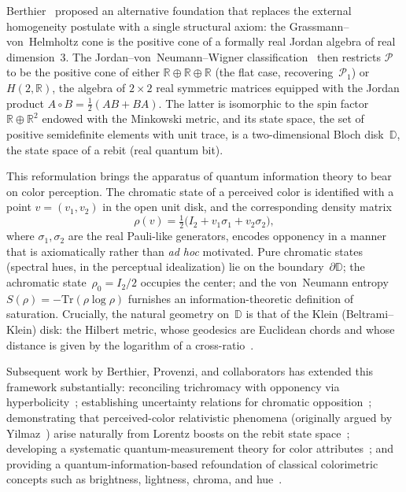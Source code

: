 \documentclass[11pt]{article}
\theoremstyle{plain}
\theoremstyle{definition}
\theoremstyle{remark}
\begin{document}
Berthier~\cite{Berthier2020} proposed an alternative foundation that replaces the external homogeneity postulate with a single structural axiom: the Grassmann--von~Helmholtz cone is the positive cone of a formally real Jordan algebra of real dimension~$3$.
The Jordan--von~Neumann--Wigner classification~\cite{Jordan1934} then restricts $\mathcal{P}$ to be the positive cone of either $\mathbb{R} \oplus \mathbb{R} \oplus \mathbb{R}$ (the flat case, recovering~$\mathcal{P}_1$) or $H(2,\mathbb{R})$, the algebra of $2 \times 2$ real symmetric matrices equipped with the Jordan product $A \circ B = \frac{1}{2}(AB + BA)$.
The latter is isomorphic to the spin factor $\mathbb{R} \oplus \mathbb{R}^2$ endowed with the Minkowski metric, and its state space, the set of positive semidefinite elements with unit trace, is a two-dimensional Bloch disk~$\mathbb{D}$, the state space of a rebit (real quantum bit).

This reformulation brings the apparatus of quantum information theory to bear on color perception.
The chromatic state of a perceived color is identified with a point $v = (v_1, v_2)$ in the open unit disk, and the corresponding density matrix
\[
\rho(v) = \tfrac{1}{2}\bigl(I_2 + v_1 \sigma_1 + v_2 \sigma_2\bigr),
\]
where $\sigma_1, \sigma_2$ are the real Pauli-like generators, encodes opponency in a manner that is axiomatically rather than \emph{ad hoc} motivated.
Pure chromatic states (spectral hues, in the perceptual idealization) lie on the boundary~$\partial\mathbb{D}$; the achromatic state~$\rho_0 = I_2/2$ occupies the center; and the von~Neumann entropy $S(\rho) = -\mathrm{Tr}(\rho \log \rho)$ furnishes an information-theoretic definition of saturation.
Crucially, the natural geometry on~$\mathbb{D}$ is that of the Klein (Beltrami--Klein) disk: the Hilbert metric, whose geodesics are Euclidean chords and whose distance is given by the logarithm of a cross-ratio~\cite{Berthier2020, Beardon1999}.

Subsequent work by Berthier, Provenzi, and collaborators has extended this framework substantially: reconciling trichromacy with opponency via hyperbolicity~\cite{BerthierProvenzi2021hyp}; establishing uncertainty relations for chromatic opposition~\cite{BerthierProvenzi2021unc}; demonstrating that perceived-color relativistic phenomena (originally argued by Yilmaz~\cite{Yilmaz1962}) arise naturally from Lorentz boosts on the rebit state space~\cite{Berthier2021rel}; developing a systematic quantum-measurement theory for color attributes~\cite{BerthierProvenzi2022proc}; and providing a quantum-information-based refoundation of classical colorimetric concepts such as brightness, lightness, chroma, and hue~\cite{BerthierPrencipeProvenzi2022}.
\end{document}
